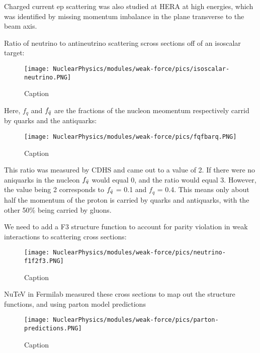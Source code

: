         Charged current ep scattering was also studied at HERA at high energies, which was identified by missing momentum imbalance in the plane transverse to the beam axis. 

    
        Ratio of neutrino to antineutrino scattering scross sections off of an isoscalar target:
        
            \begin{figure}[H]
                \centering
                \texttt{[image: NuclearPhysics/modules/weak-force/pics/isoscalar-neutrino.PNG]}
            \caption{Caption}
            \end{figure}
            
        
        Here, $f_q$ and $f_{\Bar{q}}$ are the fractions of the nucleon meomentum respectively carrid by quarks and the antiquarks:
        
            \begin{figure}[H]
                \centering
                \texttt{[image: NuclearPhysics/modules/weak-force/pics/fqfbarq.PNG]}
            \caption{Caption}
            \end{figure}
            
        
        This ratio was measured by CDHS and came out to a value of 2. If there were no aniquarks in the nucleon $f_{\Bar{q}}$ would equal 0, and the ratio would equal 3. However, the value being 2 corresponds to $f_{\Bar{q}}$ = 0.1 and $f_q$ = 0.4. This means only about half the momentum of the proton is carried by quarks and antiquarks, with the other 50\% being carried by gluons. 
        
        
        We need to add a F3 structure function to account for parity violation in weak interactions to scattering cross sections:
        
        
            \begin{figure}[H]
                \centering
                \texttt{[image: NuclearPhysics/modules/weak-force/pics/neutrino-f1f2f3.PNG]}
            \caption{Caption}
            \end{figure}
            
        
        NuTeV in Fermilab measured these cross sections to map out the structure functions, and using parton model predictions
        
            \begin{figure}[H]
                \centering
                \texttt{[image: NuclearPhysics/modules/weak-force/pics/parton-predictions.PNG]}
            \caption{Caption}
            \end{figure}
            
